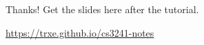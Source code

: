\documentclass{beamer}
\begin{document}

\ThankYou
\begin{frame}
    Thanks! Get the slides here after the tutorial.\\
    \vspace{2em}
    \scalebox{3}{\faGithub}\par\bigskip
    \url{https://trxe.github.io/cs3241-notes}
\end{frame}
\end{document}
